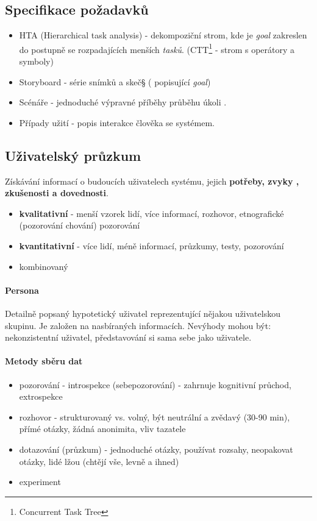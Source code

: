 \subsection{Specifikace požadavků}
\begin{itemize}[itemsep=0px]
\item HTA (Hierarchical task analysis) - dekompoziční strom, kde je \textit{goal} zakreslen do postupně se rozpadajících menších \textit{tasků}. (CTT\footnote{Concurrent Task Tree} - strom s operátory a symboly)
\item Storyboard - série snímků a skeč§ ( popisující \textit{goal})
\item Scénáře - jednoduché výpravné příběhy průběhu úkoli \textit{}.
\item Případy užití - popis interakce člověka se systémem.
\end{itemize}

\subsection{Uživatelský průzkum}
Získávání informací o budoucích uživatelech systému, jejich \textbf{potřeby, zvyky , zkušenosti a dovednosti}.

\begin{itemize}[itemsep=0px]
\item \textbf{kvalitativní} - menší vzorek lidí, více informací, rozhovor, etnografické (pozorování chování) pozorování
\item \textbf{kvantitativní} - více lidí, méně informací, průzkumy, testy, pozorování
\item kombinovaný
\end{itemize}

\paragraph{Persona}
Detailně popsaný hypotetický uživatel reprezentující nějakou uživatelskou skupinu. Je založen na nasbíraných informacích. Nevýhody mohou být: nekonzistentní uživatel, představování si sama sebe jako uživatele.

\paragraph{Metody sběru dat}
\begin{itemize}[itemsep=0px]
\item pozorování - introspekce (sebepozorování) - zahrnuje kognitivní průchod, extrospekce
\item rozhovor - strukturovaný vs. volný, být neutrální a zvědavý (30-90 min), přímé otázky, žádná anonimita, vliv tazatele
\item dotazování (průzkum) - jednoduché otázky, používat rozsahy, neopakovat otázky, lidé lžou (chtějí vše, levně a ihned)
\item experiment
\end{itemize}

